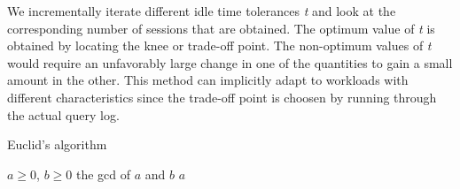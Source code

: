 We incrementally iterate different idle time tolerances \textit{t} and look at the corresponding number of sessions that are obtained. The optimum value of \textit{t} is obtained by locating the knee or trade-off point. The non-optimum values of \textit{t} would require an unfavorably large change in one of the quantities to gain a small amount in the other. \cite{satopaa2011finding}
This method can implicitly adapt to workloads with different characteristics since the trade-off point is choosen by running through the actual query log.




\begin{algorithm}[h]
 \caption{Euclid’s algorithm}
 \begin{algorithmic}[1]
   \Require
   	\Statex $a \ge 0$, $b \ge 0$
   \Ensure
   	\Statex the gcd of $a$ and $b$
    
       \Return $a$
     \Else $\;$
       \Return {}
     \EndIf
   \EndFunction
 \end{algorithmic}
\end{algorithm}

